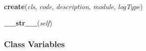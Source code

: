     \label{GroundSegment:models:Log:Log:create}

    \vspace{0.5ex}

\hspace{.8\funcindent}\begin{boxedminipage}{\funcwidth}

    \raggedright \textbf{create}(\textit{cls}, \textit{code}, \textit{description}, \textit{module}, \textit{logType})

\setlength{\parskip}{2ex}
\setlength{\parskip}{1ex}
    \end{boxedminipage}

    \label{GroundSegment:models:Log:Log:__str__}

    \vspace{0.5ex}

\hspace{.8\funcindent}\begin{boxedminipage}{\funcwidth}

    \raggedright \textbf{\_\_str\_\_}(\textit{self})

\setlength{\parskip}{2ex}
\setlength{\parskip}{1ex}
    \end{boxedminipage}



  \subsubsection{Class Variables}

